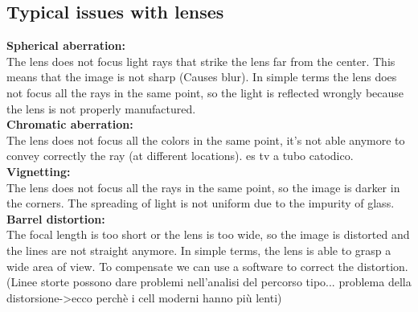 \subsection{Typical issues with lenses}
\textbf{Spherical aberration:} 
\\The lens does not focus light rays that strike the lens far from the center. This means that the image is not sharp (Causes blur).
In simple terms the lens does not focus all the rays in the same point, so the light is reflected wrongly because the lens is not properly manufactured.
\\\textbf{Chromatic aberration:}
\\The lens does not focus all the colors in the same point, it's not able anymore to convey correctly the ray (at different locations). es tv a tubo catodico.
\\\textbf{Vignetting:}
\\The lens does not focus all the rays in the same point, so the image is darker in the corners. The spreading of light is not uniform due to the impurity of glass.
\\\textbf{Barrel distortion:}
\\The focal length is too short or the lens is too wide, so the image is distorted and the lines are not straight anymore.
In simple terms, the lens is able to grasp a wide area of view. To compensate we can use a software to correct the distortion. (Linee storte possono dare problemi nell'analisi del percorso tipo... problema della distorsione->ecco perchè i cell moderni hanno più lenti)
